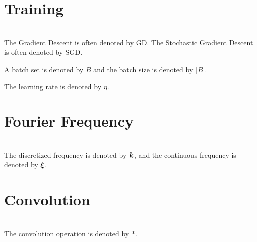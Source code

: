 \documentclass{article}
\begin{document}
\section{Training}~\\
The Gradient Descent is often denoted by GD. The Stochastic Gradient Descent is often denoted by SGD. 

A batch set is denoted by $B$ and the batch size is denoted by $|B|$.

The learning rate is denoted by $\eta$.


\section{Fourier Frequency}~\\
The discretized frequency is denoted by $\bm{k}$, and the continuous frequency is denoted by $\bm{\xi}$.

\section{Convolution}~\\
The convolution operation is denoted by $*$.

\newpage
\end{document}

